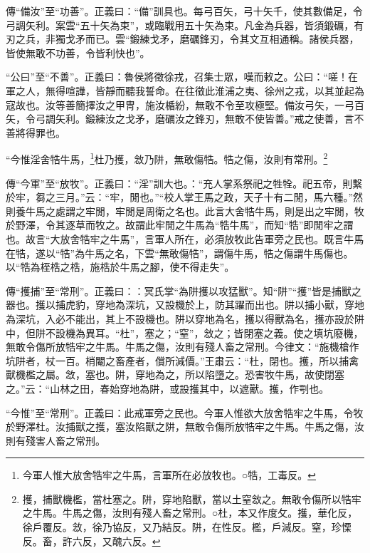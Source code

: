 {\noindent\zhuan{}\fzbyks 傳“備汝”至“功善”。正義曰：“備”訓具也。每弓百矢，弓十矢千，使其數備足，令弓調矢利。案雲“五十矢為束”，或臨戰用五十矢為束。凡金為兵器，皆須鍛礪，有刃之兵，非獨戈矛而已。雲“鍛練戈矛，磨礪鋒刃，令其文互相通稱。諸侯兵器，皆使無敢不功善，令皆利快也”。 \par}

{\noindent\shu{}\fzkt “公曰”至“不善”。正義曰：魯侯將徵徐戎，召集士眾，嘆而敕之。公曰：“嗟！在軍之人，無得喧譁，皆靜而聽我誓命。在往徵此淮浦之夷、徐州之戎，以其並起為寇故也。汝等善簡擇汝之甲冑，施汝楯紛，無敢不令至攻極堅。備汝弓矢，一弓百矢，令弓調矢利。鍛練汝之戈矛，磨礪汝之鋒刃，無敢不使皆善。”戒之使善，言不善將得罪也。 \par}

“今惟淫舍牿牛馬，\footnote{今軍人惟大放舍牿牢之牛馬，言軍所在必放牧也。○牿，工毒反。}杜乃擭，敜乃阱，無敢傷牿。牿之傷，汝則有常刑。\footnote{擭，捕獸機檻，當杜塞之。阱，穿地陷獸，當以土窒敜之。無敢令傷所以牿牢之牛馬。牛馬之傷，汝則有殘人畜之常刑。○杜，本又作度攵。擭，華化反，徐戶覆反。敜，徐乃協反，又乃結反。阱，在性反。檻，戶減反。窒，珍慄反。畜，許六反，又醜六反。}


{\noindent\zhuan{}\fzbyks 傳“今軍”至“放牧”。正義曰：“淫”訓大也。：“充人掌系祭祀之牲牷。祀五帝，則繫於牢，芻之三月。”云：“牢，閒也。”“校人掌王馬之政，天子十有二閒，馬六種。”然則養牛馬之處謂之牢閒，牢閒是周衛之名也。此言大舍牿牛馬，則是出之牢閒，牧於野澤，令其逐草而牧之。故謂此牢閒之牛馬為“牿牛馬”，而知“牿”即閒牢之謂也。故言“大放舍牿牢之牛馬”，言軍人所在，必須放牧此告軍旁之民也。既言牛馬在牿，遂以“牿”為牛馬之名，下雲“無敢傷牿”，謂傷牛馬，牿之傷謂牛馬傷也。以“牿為桎梏之梏，施梏於牛馬之腳，使不得走失”。 \par}

{\noindent\zhuan{}\fzbyks 傳“擭捕”至“常刑”。正義曰：：冥氏掌“為阱擭以攻猛獸”。知“阱”“擭”皆是捕獸之器也。擭以捕虎豹，穿地為深坑，又設機於上，防其躍而出也。阱以捕小獸，穿地為深坑，入必不能出，其上不設機也。阱以穿地為名，擭以得獸為名，擭亦設於阱中，但阱不設機為異耳。“杜”，塞之；“窒”，敜之；皆閉塞之義。使之填坑廢機，無敢令傷所放牿牢之牛馬。牛馬之傷，汝則有殘人畜之常刑。今律文：“施機槍作坑阱者，杖一百。梢閹之畜產者，償所減價。”王肅云：“杜，閉也。擭，所以捕禽獸機檻之屬。敜，塞也。阱，穿地為之，所以陷墮之。恐害牧牛馬，故使閉塞之。”云：“山林之田，春始穿地為阱，或設擭其中，以遮獸。擭，作㓵也。 \par}

{\noindent\shu{}\fzkt “今惟”至“常刑”。正義曰：此戒軍旁之民也。今軍人惟欲大放舍牿牢之牛馬，令牧於野澤杜。汝捕獸之擭，塞汝陷獸之阱，無敢令傷所放牿牢之牛馬。牛馬之傷，汝則有殘害人畜之常刑。 \par}

